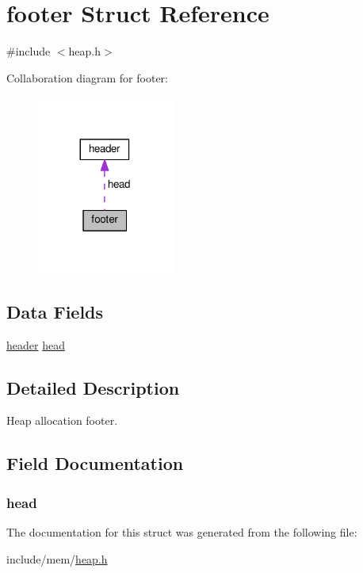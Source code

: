 \hypertarget{structfooter}{}\section{footer Struct Reference}
\label{structfooter}


{\ttfamily \#include $<$heap.\+h$>$}



Collaboration diagram for footer\+:\nopagebreak
\begin{figure}[H]
\begin{center}
\leavevmode
\includegraphics[width=128pt]{structfooter__coll__graph}
\end{center}
\end{figure}
\subsection*{Data Fields}
\begin{DoxyCompactItemize}
\item 
\hyperlink{structheader}{header} \hyperlink{structfooter_a0e77a30e5469bc62f17579602fc74bc3}{head}
\end{DoxyCompactItemize}


\subsection{Detailed Description}
Heap allocation footer. 

\subsection{Field Documentation}
\subsubsection[{\texorpdfstring{head}{head}}]{ head}\hypertarget{structfooter_a0e77a30e5469bc62f17579602fc74bc3}{}\label{structfooter_a0e77a30e5469bc62f17579602fc74bc3}


The documentation for this struct was generated from the following file\+:\begin{DoxyCompactItemize}
\item 
include/mem/\hyperlink{heap_8h}{heap.\+h}\end{DoxyCompactItemize}
